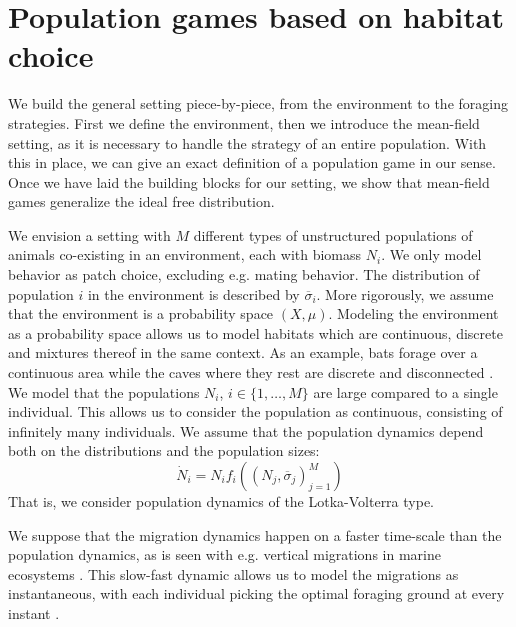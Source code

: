\section{Population games based on habitat choice}
\label{sec:general_setting}
We build the general setting piece-by-piece, from the environment to the foraging strategies. First we define the environment, then we introduce the mean-field setting, as it is necessary to handle the strategy of an entire population. With this in place, we can give an exact definition of a population game in our sense. Once we have laid the building blocks for our setting, we show that mean-field games generalize the ideal free distribution.


We envision a setting with $M$ different types of unstructured populations of animals co-existing in an environment, each with biomass $N_i$. We only model behavior as patch choice, excluding e.g. mating behavior. The distribution of population $i$ in the environment is described by $\overbar{\sigma}_i$.  More rigorously, we assume that the environment is a probability space $(X,\mu)$. Modeling the environment as a probability space allows us to model habitats which are continuous, discrete and mixtures thereof in the same context. As an example, bats forage over a continuous area while the caves where they rest are discrete and disconnected \citep{collet2019algorithmic}. We model that the populations $N_i$, $i\in \{1,\dots,M\}$  are large compared to a single individual. This allows us to consider the population as continuous, consisting of infinitely many individuals. We assume that the population dynamics depend both on the distributions and the population sizes:
\begin{equation}
  \label{eq:vk_dyn}
  \dot{N}_i = N_i f_i((N_j,\overbar{\sigma}_j)_{j=1}^M)
\end{equation}
That is, we consider population dynamics of the Lotka-Volterra type.


We suppose that the migration dynamics happen on a faster time-scale than the population dynamics, as is seen with e.g. vertical migrations in marine ecosystems \citep{iwasa1982vertical}. This slow-fast dynamic allows us to model the migrations as instantaneous, with each individual picking the optimal foraging ground at every instant \citep{kvrivan2013behavioral, cressman2006migration}.


